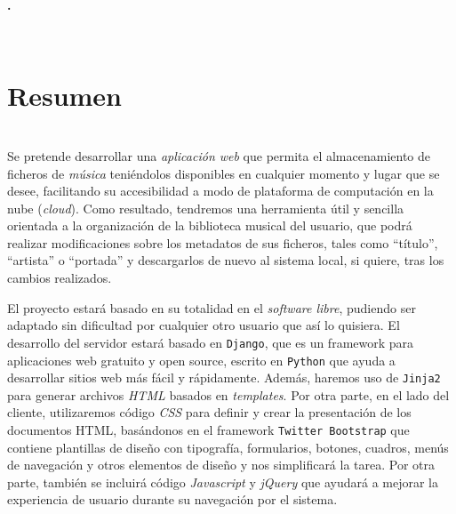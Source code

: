 

\begin{center}
{\large\bfseries \myTitle. \mySubTitle}\\
\end{center}
\begin{center}
\myName\\
\end{center}

\section*{Resumen}

\bigskip
{}\\

Se pretende desarrollar una \textit{aplicación web} que permita el almacenamiento de ficheros de \textit{música} teniéndolos disponibles en cualquier momento y lugar que se desee, facilitando su accesibilidad a modo de plataforma de computación en la nube (\textit{cloud}). Como resultado, tendremos una herramienta útil y sencilla orientada a la organización de la biblioteca musical del usuario, que podrá realizar modificaciones sobre los metadatos de sus ficheros, tales como ``título'', ``artista'' o ``portada'' y descargarlos de nuevo al sistema local, si quiere, tras los cambios realizados.

El proyecto estará basado en su totalidad en el \textit{software libre}, pudiendo ser adaptado sin dificultad por cualquier otro usuario que así lo quisiera. El desarrollo del servidor estará basado en {\tt Django}, que es un framework para aplicaciones web gratuito y open source, escrito en {\tt Python} que ayuda a desarrollar sitios web más fácil y rápidamente. Además, haremos uso de {\tt Jinja2} para generar archivos \textit{HTML} basados en \textit{templates}. Por otra parte, en el lado del cliente, utilizaremos código \textit{CSS} para definir y crear la presentación de los documentos HTML, basándonos en el framework {\tt Twitter Bootstrap} que contiene plantillas de diseño con tipografía, formularios, botones, cuadros, menús de navegación y otros elementos de diseño y nos simplificará la tarea. Por otra parte, también se incluirá código \textit{Javascript} y \textit{jQuery} que ayudará a mejorar la experiencia de usuario durante su navegación por el sistema.

